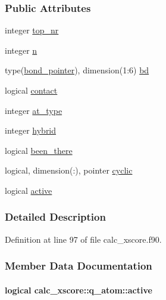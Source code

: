 \subsubsection*{Public Attributes}
\begin{DoxyCompactItemize}
\item 
integer \hyperlink{structcalc__xscore_1_1q__atom_a4a8f3beed64e684110a227831bb975bb}{top\-\_\-nr}
\item 
integer \hyperlink{structcalc__xscore_1_1q__atom_ae5567a8513707eb98c99237a5017940b}{n}
\item 
type(\hyperlink{structcalc__xscore_1_1bond__pointer}{bond\-\_\-pointer}), dimension(1\-:6) \hyperlink{structcalc__xscore_1_1q__atom_a0a0f16815040612804aa51b4cea79305}{bd}
\item 
logical \hyperlink{structcalc__xscore_1_1q__atom_afb73de8506d92424ff9369cf0a36923e}{contact}
\item 
integer \hyperlink{structcalc__xscore_1_1q__atom_a651cbb39d34397b5a4ed337abedf78ce}{at\-\_\-type}
\item 
integer \hyperlink{structcalc__xscore_1_1q__atom_a9456289faa736d24b4d3599f14aa118f}{hybrid}
\item 
logical \hyperlink{structcalc__xscore_1_1q__atom_ae52dea0a494b1da91d248bf279ded95d}{been\-\_\-there}
\item 
logical, dimension(\-:), pointer \hyperlink{structcalc__xscore_1_1q__atom_a75e2c42e139bf380e09f9d4a6d6251bd}{cyclic}
\item 
logical \hyperlink{structcalc__xscore_1_1q__atom_a81afa958d382405f9c1c59e388f04e94}{active}
\end{DoxyCompactItemize}


\subsubsection{Detailed Description}


Definition at line 97 of file calc\-\_\-xscore.\-f90.



\subsubsection{Member Data Documentation}
\hypertarget{structcalc__xscore_1_1q__atom_a81afa958d382405f9c1c59e388f04e94}{
\paragraph[{active}]{\setlength{\rightskip}{0pt plus 5cm}logical calc\-\_\-xscore\-::q\-\_\-atom\-::active}}\label{structcalc__xscore_1_1q__atom_a81afa958d382405f9c1c59e388f04e94}


